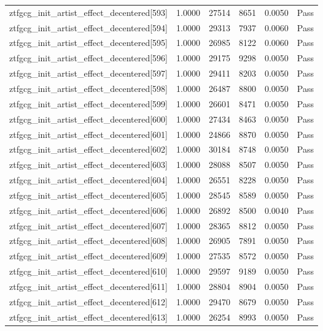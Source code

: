 \begin{table}[htbp]
\begin{tabular}{llrrll}
ztfgcg\_init\_artist\_effect\_decentered[593] & 1.0000 & 27514 & 8651 & 0.0050 & Pass \\
ztfgcg\_init\_artist\_effect\_decentered[594] & 1.0000 & 29313 & 7937 & 0.0060 & Pass \\
ztfgcg\_init\_artist\_effect\_decentered[595] & 1.0000 & 26985 & 8122 & 0.0060 & Pass \\
ztfgcg\_init\_artist\_effect\_decentered[596] & 1.0000 & 29175 & 9298 & 0.0050 & Pass \\
ztfgcg\_init\_artist\_effect\_decentered[597] & 1.0000 & 29411 & 8203 & 0.0050 & Pass \\
ztfgcg\_init\_artist\_effect\_decentered[598] & 1.0000 & 26487 & 8800 & 0.0050 & Pass \\
ztfgcg\_init\_artist\_effect\_decentered[599] & 1.0000 & 26601 & 8471 & 0.0050 & Pass \\
ztfgcg\_init\_artist\_effect\_decentered[600] & 1.0000 & 27434 & 8463 & 0.0050 & Pass \\
ztfgcg\_init\_artist\_effect\_decentered[601] & 1.0000 & 24866 & 8870 & 0.0050 & Pass \\
ztfgcg\_init\_artist\_effect\_decentered[602] & 1.0000 & 30184 & 8748 & 0.0050 & Pass \\
ztfgcg\_init\_artist\_effect\_decentered[603] & 1.0000 & 28088 & 8507 & 0.0050 & Pass \\
ztfgcg\_init\_artist\_effect\_decentered[604] & 1.0000 & 26551 & 8228 & 0.0050 & Pass \\
ztfgcg\_init\_artist\_effect\_decentered[605] & 1.0000 & 28545 & 8589 & 0.0050 & Pass \\
ztfgcg\_init\_artist\_effect\_decentered[606] & 1.0000 & 26892 & 8500 & 0.0040 & Pass \\
ztfgcg\_init\_artist\_effect\_decentered[607] & 1.0000 & 28365 & 8812 & 0.0050 & Pass \\
ztfgcg\_init\_artist\_effect\_decentered[608] & 1.0000 & 26905 & 7891 & 0.0050 & Pass \\
ztfgcg\_init\_artist\_effect\_decentered[609] & 1.0000 & 27535 & 8572 & 0.0050 & Pass \\
ztfgcg\_init\_artist\_effect\_decentered[610] & 1.0000 & 29597 & 9189 & 0.0050 & Pass \\
ztfgcg\_init\_artist\_effect\_decentered[611] & 1.0000 & 28804 & 8904 & 0.0050 & Pass \\
ztfgcg\_init\_artist\_effect\_decentered[612] & 1.0000 & 29470 & 8679 & 0.0050 & Pass \\
ztfgcg\_init\_artist\_effect\_decentered[613] & 1.0000 & 26254 & 8993 & 0.0050 & Pass \\

\end{tabular}
\end{table}
